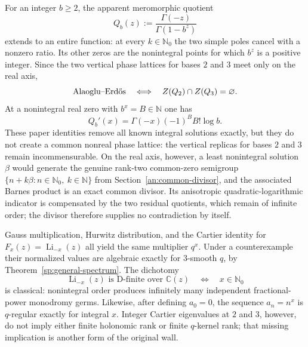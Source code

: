 \documentclass[11pt,oneside]{article}
\theoremstyle{definition}
\theoremstyle{remark}
\newcommand{\N}{\mathbb N}
\newcommand{\Nzero}{\mathbb N_0}
\newcommand{\C}{\mathbb C}
\begin{document}
For an integer $b\ge2$, the apparent meromorphic quotient
\begin{equation}
 Q_b(z):=\frac{\Gamma(-z)}{\Gamma(1-b^z)}
 \label{trf:eq-entire-quotient}
\end{equation}
extends to an entire function: at every $k\in\Nzero$ the two simple poles cancel with a
nonzero ratio.  Its other zeros are the nonintegral points for which $b^z$ is a positive
integer.  Since the two vertical phase lattices for bases $2$ and $3$ meet only on the real
axis,
\begin{equation}
 \text{Alaoglu--Erd\H{o}s}\quad\Longleftrightarrow\quad
 Z(Q_2)\cap Z(Q_3)=\varnothing.
 \label{trf:eq-entire-coprime}
\end{equation}
At a nonintegral real zero with $b^x=B\in\N$ one has
\begin{equation}
 Q_b'(x)=\Gamma(-x)(-1)^B B!\log b.
 \label{trf:eq-entire-derivative}
\end{equation}
These paper identities remove all known integral solutions exactly, but they do not create a
common nonreal phase lattice: the vertical replicas for bases $2$ and $3$ remain
incommensurable.  On the real axis, however, a least nonintegral solution $\beta$ would
generate the genuine rank-two common-zero semigroup
$\{n+k\beta:n\in\Nzero,\ k\in\N\}$ from
Section~\ref{an:common-divisor}, and the associated Barnes product is an exact common
divisor.  Its anisotropic quadratic-logarithmic indicator is compensated by the two
residual quotients, which remain of infinite order; the divisor therefore supplies no
contradiction by itself.

Gauss multiplication, Hurwitz distribution, and the Cartier identity for
$F_x(z)=\operatorname{Li}_{-x}(z)$ all yield the same multiplier $q^x$.  Under a
counterexample their normalized values are algebraic exactly for $3$-smooth $q$, by
Theorem~\ref{sp:general-spectrum}.  The dichotomy
\begin{equation}
 \operatorname{Li}_{-x}(z)\text{ is D-finite over }\C(z)
 \quad\Longleftrightarrow\quad x\in\Nzero
 \label{trf:eq-holonomic}
\end{equation}
is classical: nonintegral order produces infinitely many independent fractional-power
monodromy germs.  Likewise, after defining $a_0=0$, the sequence $a_n=n^x$ is $q$-regular
exactly for integral $x$.  Integer Cartier eigenvalues at $2$ and $3$, however, do not imply
either finite holonomic rank or finite $q$-kernel rank; that missing implication is another
form of the original wall.
\end{document}
